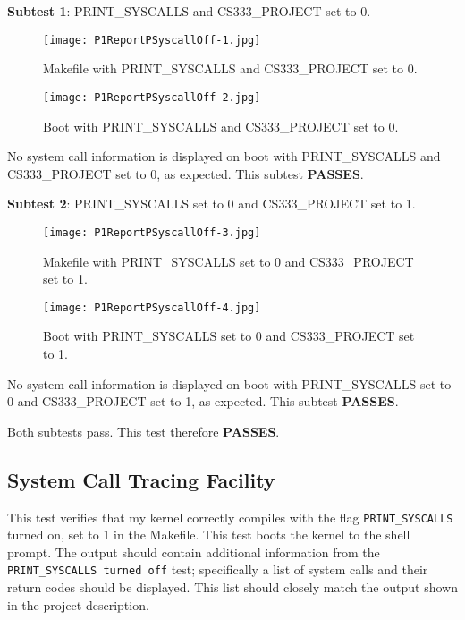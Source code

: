 \documentclass[11pt,letterpaper]{report}
\begin{document}
{  \textbf{Subtest 1}: PRINT\_SYSCALLS  and CS333\_PROJECT set to 0.
  
  \begin{figure}[h!]
    \centering
    \texttt{[image: P1ReportPSyscallOff-1.jpg]}
    \caption[Syscall Trace Disabled-1]{Makefile with PRINT\_SYSCALLS  and CS333\_PROJECT set to 0.}
    \label{fig:syscalltracedisabled-1}
  \end{figure}

  \begin{figure}[h!]
  	\centering
  	\texttt{[image: P1ReportPSyscallOff-2.jpg]}
  	\caption[Syscall Trace Disabled-2]{Boot with PRINT\_SYSCALLS  and CS333\_PROJECT set to 0.}
  	\label{fig:syscalltracedisabled-2}
  \end{figure}

  No system call information is displayed on boot with PRINT\_SYSCALLS  and CS333\_PROJECT set to 0, as expected. This subtest {\bf PASSES}.
  
  \pagebreak
  \textbf{Subtest 2}: PRINT\_SYSCALLS set to 0 and CS333\_PROJECT set to 1.
  
  \begin{figure}[h!]
  	\centering
  	\texttt{[image: P1ReportPSyscallOff-3.jpg]}
  	\caption[Syscall Trace Disabled-3]{Makefile with PRINT\_SYSCALLS set to 0  and CS333\_PROJECT set to 1.}
  	\label{fig:syscalltracedisabled-3}
  \end{figure}
  
  \begin{figure}[h!]
  	\centering
  	\texttt{[image: P1ReportPSyscallOff-4.jpg]}
  	\caption[Syscall Trace Disabled-4]{Boot with PRINT\_SYSCALLS set to 0 and CS333\_PROJECT set to 1.}
  	\label{fig:syscalltracedisabled-4}
  \end{figure}
  
  No system call information is displayed on boot with PRINT\_SYSCALLS set to 0  and CS333\_PROJECT set to 1, as expected. This subtest {\bf PASSES}.
  
  Both subtests pass. This test therefore \textbf{PASSES}.



  \clearpage
  \subsection*{System Call Tracing Facility}

  This test verifies that my kernel correctly compiles with the flag {\tt PRINT\_SYSCALLS} turned on, set to 1 in the Makefile.
  This test boots the kernel to the shell prompt. The output should contain additional information from the \texttt{PRINT\_SYSCALLS turned off} test; 
  specifically a list of system calls and their return codes should be displayed. This list should closely match the output shown in the
  project description.
  
}
\end{document}
